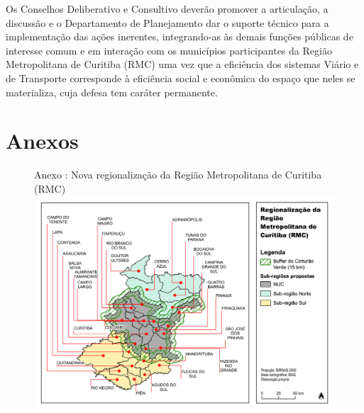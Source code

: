 \documentclass[capitulo]{br-lex-2017}
\newcounter{anexonumero}
\newcommand{\anexo}[1]{\hfill Anexo \stepcounter{anexonumero}\theanexonumero: #1}
\begin{document}
\paragrafo Os Conselhos Deliberativo e Consultivo deverão promover a articulação, a discussão e o Departamento de Planejamento dar o suporte técnico para a implementação das ações inerentes, integrando-as às demais funções públicas de interesse comum e em interação com os municípios participantes da Região Metropolitana de Curitiba (RMC) uma vez que a eficiência dos sistemas Viário e de Transporte corresponde à eficiência social e econômica do espaço que neles se materializa, cuja defesa tem caráter permanente.

\chapter*{Anexos}

	\begin{figure}[h!]
		\centering
		\anexo{Nova regionalização da Região Metropolitana de Curitiba (RMC)}
		\includegraphics[width=1\linewidth]{../gis/produtos/RMC_subregioes_lei}
	\end{figure}
\end{document}
